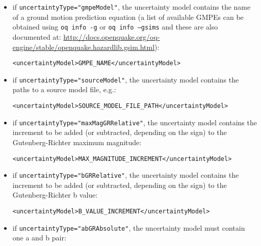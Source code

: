 \begin{itemize}

    \item if \Verb+uncertaintyType="gmpeModel"+, the uncertainty model
	contains the name of a ground motion prediction equation (a list of
	available GMPEs can be obtained using \texttt{oq info -g} or 
	\texttt{oq info --gsims} and these are also documented at:
	\href{http://docs.openquake.org/oq-engine/stable/openquake.hazardlib.gsim.html}{http://docs.openquake.org/oq-engine/stable/openquake.hazardlib.gsim.html}):

    \begin{verbatim}
<uncertaintyModel>GMPE_NAME</uncertaintyModel>
	\end{verbatim}

    \item if \Verb+uncertaintyType="sourceModel"+, the uncertainty model
	contains the paths to a source model file, e.g.:

    \begin{verbatim}
<uncertaintyModel>SOURCE_MODEL_FILE_PATH</uncertaintyModel>
	\end{verbatim}

    \item if \Verb+uncertaintyType="maxMagGRRelative"+, the uncertainty model
	contains the increment to be added (or subtracted, depending on the sign)
	to the Gutenberg-Richter maximum magnitude:

    \begin{verbatim}
<uncertaintyModel>MAX_MAGNITUDE_INCREMENT</uncertaintyModel>
	\end{verbatim}

    \item if \Verb+uncertaintyType="bGRRelative"+, the uncertainty model
	contains the increment to be added (or subtracted, depending on the sign)
	to the Gutenberg-Richter b value:

    \begin{verbatim}
<uncertaintyModel>B_VALUE_INCREMENT</uncertaintyModel>
	\end{verbatim}

    \item if \Verb+uncertaintyType="abGRAbsolute"+, the uncertainty model
	must contain one a and b pair:


\end{itemize}
